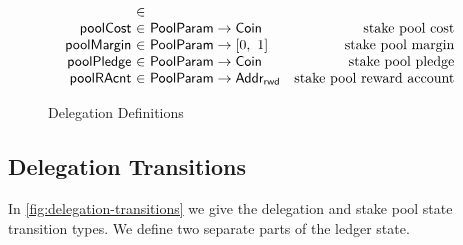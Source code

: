 \begin{figure}[htb]
\begin{equation*}
\begin{array}{r@{~\in~}lr}
    \\
    \fun{poolCost} & \PoolParam \to \Coin
                     & \text{stake pool cost}
    \\
    \fun{poolMargin} & \PoolParam \to \unitInterval
                     & \text{stake pool margin}
    \\
    \fun{poolPledge} & \PoolParam \to \Coin
                     & \text{stake pool pledge}
    \\
    \fun{poolRAcnt} & \PoolParam \to \AddrRWD
                     & \text{stake pool reward account}
    \\
  \end{array}
  \end{equation*}

  \caption{Delegation Definitions}
  \label{fig:delegation-defs}
\end{figure}

\clearpage

\subsection{Delegation Transitions}
\label{sec:deleg-trans}


In \cref{fig:delegation-transitions} we give the delegation and stake pool
state transition types. We define two separate parts of the ledger state.

